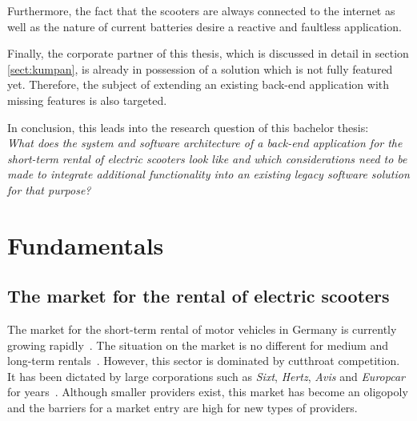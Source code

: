 \documentclass[12pt,a4paper]{report}
\begin{document}
Furthermore, the fact that the scooters are always connected to the internet
as well as the nature of current batteries desire a reactive and faultless application.

Finally, the corporate partner of this thesis, which is discussed in detail
in section \ref{sect:kumpan}, is already in possession of a solution which is not fully featured yet.
Therefore, the subject of extending an existing back-end application with missing features is also targeted.

In conclusion, this leads into the research question of this bachelor thesis:\\
\emph{What does the system and software architecture of a back-end application
for the short-term rental of electric scooters look like and which considerations
need to be made to integrate additional functionality into an
existing legacy software solution for that purpose?}



\chapter{Fundamentals} \label{chap:fundamentals}



\section{The market for the rental of electric scooters} \label{sect:electric-scooter-market}

The market for the short-term rental of motor vehicles in Germany
is currently growing rapidly~\cite{bundesverband-carsharing-statistics}.
The situation on the market is no different for medium and long-term rentals~\cite{sparkasse-kfz-vermietung}.
However, this sector is dominated by cutthroat competition.
It has been dictated by large corporations such as \textit{Sixt}, \textit{Hertz},
\textit{Avis} and \textit{Europcar} for years~\cite{sparkasse-kfz-vermietung}.
Although smaller providers exist, this market has become an oligopoly and
the barriers for a market entry are high for new types of providers.
\end{document}
